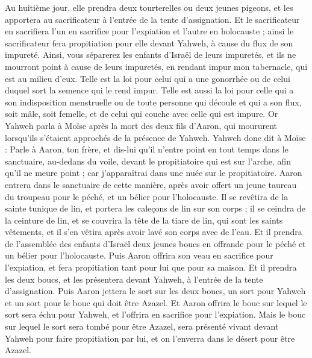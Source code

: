 \begin{multicols}{2}
Au huitième jour, elle prendra deux tourterelles ou deux jeunes pigeons, et les apportera au sacrificateur à l'entrée de la tente d'assignation.
Et le sacrificateur en sacrifiera l'un en sacrifice pour l'expiation et l'autre en holocauste ; ainsi le sacrificateur fera propitiation pour elle devant Yahweh, à cause du flux de son impureté.
Ainsi, vous séparerez les enfants d'Israël de leurs impuretés, et ils ne mourront point à cause de leurs impuretés, en rendant impur mon tabernacle, qui est au milieu d'eux.
Telle est la loi pour celui qui a une gonorrhée ou de celui duquel sort la semence qui le rend impur.
Telle est aussi la loi pour celle qui a son indisposition menstruelle ou de toute personne qui découle et qui a son flux, soit mâle, soit femelle, et de celui qui couche avec celle qui est impure.
\VerseOne{}Or Yahweh parla à Moïse après la mort des deux fils d'Aaron, qui moururent lorsqu'ils s'étaient approchés de la présence de Yahweh.
Yahweh donc dit à Moïse : Parle à Aaron, ton frère, et dis-lui qu'il n'entre point en tout temps dans le sanctuaire, au-dedans du voile, devant le propitiatoire qui est sur l'arche, afin qu'il ne meure point ; car j'apparaîtrai dans une nuée sur le propitiatoire.
Aaron entrera dans le sanctuaire de cette manière, après avoir offert un jeune taureau du troupeau pour le péché, et un bélier pour l'holocauste.
Il se revêtira de la sainte tunique de lin, et portera les caleçons de lin sur son corps ; il se ceindra de la ceinture de lin, et se couvrira la tête de la tiare de lin, qui sont les saints vêtements, et il s'en vêtira après avoir lavé son corps avec de l'eau.
Et il prendra de l'assemblée des enfants d'Israël deux jeunes boucs en offrande pour le péché et un bélier pour l'holocauste.
Puis Aaron offrira son veau en sacrifice pour l'expiation, et fera propitiation tant pour lui que pour sa maison.
Et il prendra les deux boucs, et les présentera devant Yahweh, à l'entrée de la tente d'assignation.
Puis Aaron jettera le sort sur les deux boucs, un sort pour Yahweh et un sort pour le bouc qui doit être Azazel.
Et Aaron offrira le bouc sur lequel le sort sera échu pour Yahweh, et l'offrira en sacrifice pour l'expiation.
Mais le bouc sur lequel le sort sera tombé pour être Azazel, sera présenté vivant devant Yahweh pour faire propitiation par lui, et on l'enverra dans le désert pour être Azazel.

\end{multicols}
